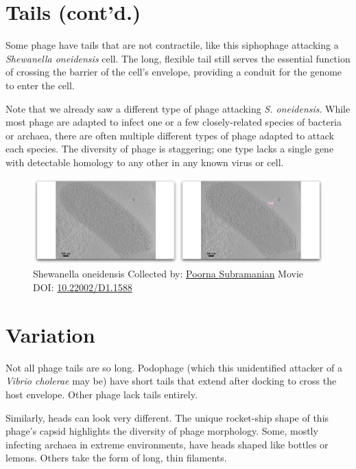 \documentclass[]{tufte-book}
\begin{document}
\section{Tails (cont'd.)}\label{tails-contd.}

Some phage have tails that are not contractile, like this siphophage
attacking a \emph{Shewanella oneidensis} cell. The long, flexible tail
still serves the essential function of crossing the barrier of the
cell's envelope, providing a conduit for the genome to enter the cell.

Note that we already saw a different type of phage attacking \emph{S.
oneidensis}. While most phage are adapted to infect one or a few
closely-related species of bacteria or archaea, there are often multiple
different types of phage adapted to attack each species. The diversity
of phage is staggering; one type lacks a single gene with detectable
homology to any other in any known virus or cell.





\begin{figure}
\includegraphics{movie_stills/10_3} \caption[Shewanella oneidensis Collected by:
\protect\hyperlink{poorna_subramanian}{Poorna Subramanian} Movie DOI:
\href{https://doi.org/10.22002/D1.1588}{10.22002/D1.1588}]{Shewanella oneidensis Collected by:
\protect\hyperlink{poorna_subramanian}{Poorna Subramanian} Movie DOI:
\href{https://doi.org/10.22002/D1.1588}{10.22002/D1.1588}}\label{fig:10-3}
\end{figure}

\section{Variation}\label{variation-1}

Not all phage tails are so long. Podophage (which this unidentified
attacker of a \emph{Vibrio cholerae} may be) have short tails that
extend after docking to cross the host envelope. Other phage lack tails
entirely.

Similarly, heads can look very different. The unique rocket-ship shape
of this phage's capsid highlights the diversity of phage morphology.
Some, mostly infecting archaea in extreme environments, have heads
shaped like bottles or lemons. Others take the form of long, thin
filaments.
\end{document}
